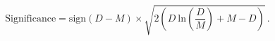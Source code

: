 \begin{equation}\label{eqn:resmap_signif2}
  \textrm{Significance} = \textrm{sign}(D-M) \times \sqrt{ 2 \left ( D \: \textrm{ln} \left ( \frac{D}{M} \right ) + M - D \right ) } \,.
\end{equation}

%
%
%
